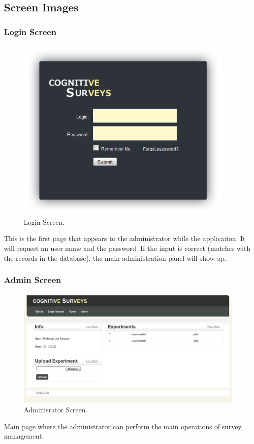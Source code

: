 \documentclass[a4paper,12pt,oneside]{report}
\begin{document}
\subsection{ Screen Images }
\vskip 0.8cm
\subsubsection{Login Screen}
\begin{figure}[h!!]
  \begin{center}
   \includegraphics[width=10.7cm]{pics/login.png}
  \end{center}
\caption{Login Screen.}
\end{figure}
\vskip  1.4cm
This is the first page that appears to the administrator while the application. It will request an user name and the password. If the input is correct (matches with the records in the database), the main administration panel will show up.

\newpage
\subsubsection{Admin Screen}
\begin{figure}[hp!!]
  \begin{center}
   \includegraphics[width=14cm]{pics/adminPage.png}
  \end{center}
\caption{Adminisrator Screen.}
\end{figure}
Main page where the administrator can perform the main operations of survey management.
\end{document}
